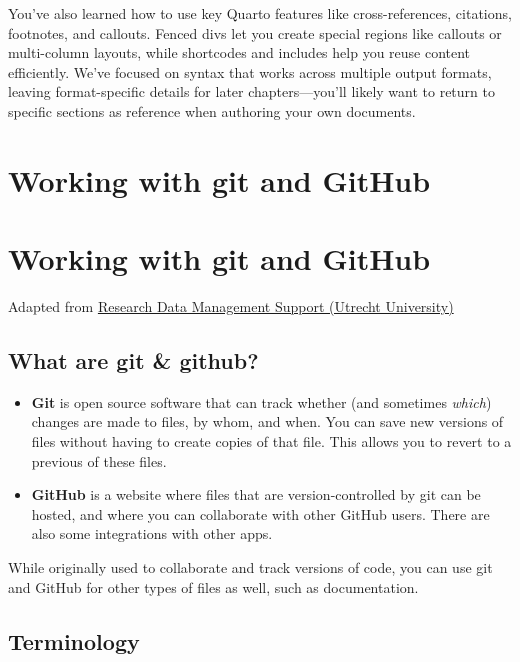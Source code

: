 \documentclass[
  letterpaper,
  DIV=11,
  numbers=noendperiod,
  oneside]{scrreprt}
\providecommand{\tightlist}{%
  \setlength{\itemsep}{0pt}\setlength{\parskip}{0pt}}
\begin{document}
\begin{tcolorbox}
You've also learned how to use key Quarto features like
cross-references, citations, footnotes, and callouts. Fenced divs let
you create special regions like callouts or multi-column layouts, while
shortcodes and includes help you reuse content efficiently. We've
focused on syntax that works across multiple output formats, leaving
format-specific details for later chapters---you'll likely want to
return to specific sections as reference when authoring your own
documents.

\chapter{Working with git and GitHub}\label{working-with-git-and-github}

\chapter{Working with git and
GitHub}\label{working-with-git-and-github-1}

Adapted from
\href{https://utrechtuniversity.github.io/open-textbooks/}{Research Data
Management Support (Utrecht University)}

\section{What are git \& github?}\label{what-are-git-github}

\begin{itemize}
\tightlist
\item
  \textbf{Git} is open source software that can track whether (and
  sometimes \emph{which}) changes are made to files, by whom, and when.
  You can save new versions of files without having to create copies of
  that file. This allows you to revert to a previous of these files.
\item
  \textbf{GitHub} is a website where files that are version-controlled
  by git can be hosted, and where you can collaborate with other GitHub
  users. There are also some integrations with other apps.
\end{itemize}

While originally used to collaborate and track versions of code, you can
use git and GitHub for other types of files as well, such as
documentation.

\section{Terminology}\label{terminology}


\end{tcolorbox}
\end{document}
